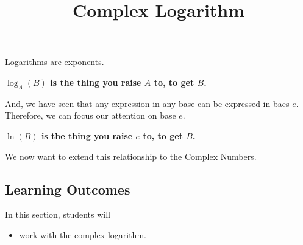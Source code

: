 \documentclass{ximera}
\title{Complex Logarithm}
\begin{document}
\begin{abstract}
%
\end{abstract}
\maketitle






Logarithms are exponents.

\begin{center}
\textbf{\textcolor{red!80!black}{$\log_A(B)$ is the thing you raise $A$ to, to get $B$.}}
\end{center}


And, we have seen that any expression in any base can be expressed in baes $e$. Therefore, we can focus our attention on base $e$.



\begin{center}
\textbf{\textcolor{red!80!black}{$\ln(B)$ is the thing you raise $e$ to, to get $B$.}}
\end{center}





We now want to extend this relationship to the Complex Numbers.







\subsection{Learning Outcomes}

\begin{sectionOutcomes}
In this section, students will 

\begin{itemize}
\item work with the complex logarithm.
\end{itemize}
\end{sectionOutcomes}
\end{document}
